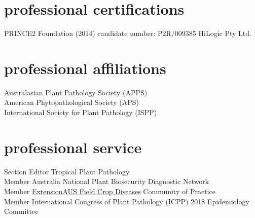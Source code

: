 \section*{professional certifications}
        PRINCE2 Foundation (2014) candidate number: P2R/009385  HiLogic Pty Ltd.

\section*{professional affiliations}
  Australasian Plant Pathology Society (APPS)\\[3 mm]
  American Phytopathological Society (APS)\\[3 mm]
  International Society for Plant Pathology (ISPP)\\

\section*{professional service}
  Section Editor Tropical Plant Pathology\\[3 mm]
  Member Australia National Plant Biosecurity Diagnostic Network\\[3 mm]
  Member \href{http://extensionaus.com.au/field-crop-diseases/}{ExtensionAUS Field Crop Diseases} Community of Practice\\[3 mm]
  Member International Congress of Plant Pathology (ICPP) 2018 Epidemiology Committee\\
